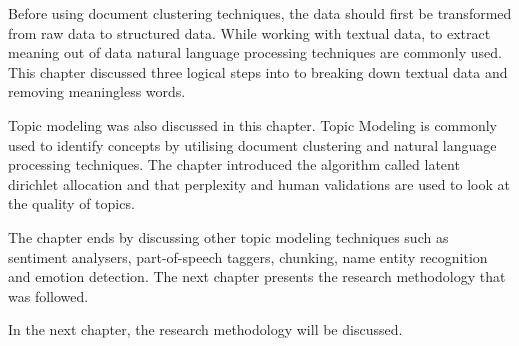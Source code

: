 Before using document clustering techniques, the data should first be transformed from raw data to structured data. While working with textual data, to extract meaning out of data natural language processing techniques are commonly used. This chapter discussed three logical steps into to breaking down textual data and removing meaningless words.

Topic modeling was also discussed in this chapter. Topic Modeling is commonly used to identify concepts by utilising document clustering and natural language processing techniques. The chapter introduced the algorithm called latent dirichlet allocation and that perplexity and human validations are used to look at the quality of topics.

The chapter ends by discussing other topic modeling techniques such as sentiment analysers, part-of-speech taggers, chunking, name entity recognition and emotion detection.
The next chapter presents the research methodology that was followed.

In the next chapter, the research methodology will be discussed.